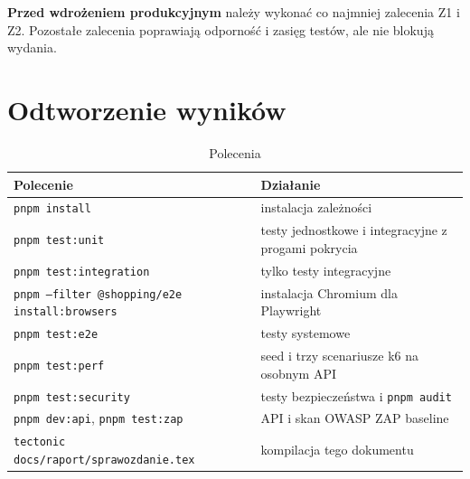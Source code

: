 \documentclass[a4paper,11pt]{article}
\newcommand{\code}[1]{\texttt{\small #1}}
\begin{document}
\begin{uwaga}
\small\textbf{Przed wdrożeniem produkcyjnym} należy wykonać co najmniej zalecenia Z1 i Z2.
Pozostałe zalecenia poprawiają odporność i zasięg testów, ale nie blokują wydania.
\end{uwaga}

\appendix
\section{Odtworzenie wyników}

\begin{table}[H]
\centering\small
\begin{tabularx}{\textwidth}{@{}l L@{}}
\toprule
\textsf{\textbf{Polecenie}} & \textsf{\textbf{Działanie}}\\
\midrule
\code{pnpm install} & instalacja zależności\\
\code{pnpm test:unit} & testy jednostkowe i integracyjne z progami pokrycia\\
\code{pnpm test:integration} & tylko testy integracyjne\\
\code{pnpm --filter @shopping/e2e install:browsers} & instalacja Chromium dla Playwright\\
\code{pnpm test:e2e} & testy systemowe\\
\code{pnpm test:perf} & seed i trzy scenariusze k6 na osobnym API\\
\code{pnpm test:security} & testy bezpieczeństwa i \code{pnpm audit}\\
\code{pnpm dev:api}, \code{pnpm test:zap} & API i skan OWASP ZAP baseline\\
\code{tectonic docs/raport/sprawozdanie.tex} & kompilacja tego dokumentu\\
\bottomrule
\end{tabularx}
\caption{Polecenia}
\end{table}
\end{document}
